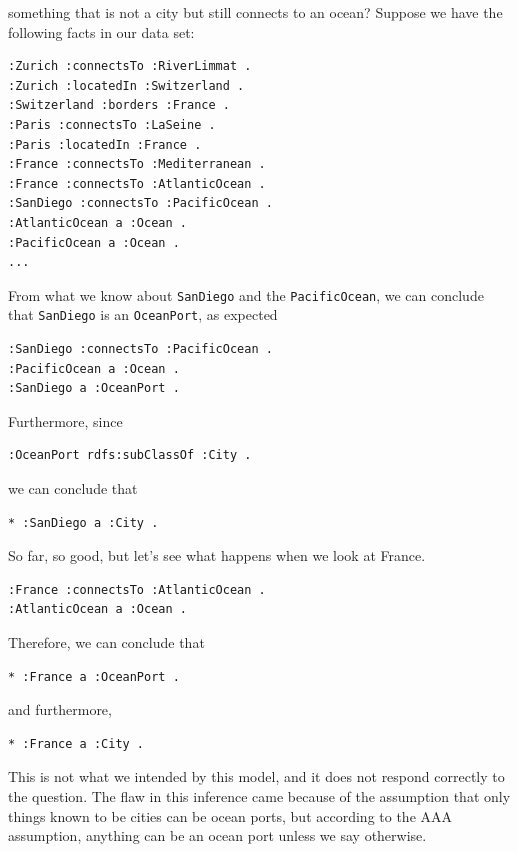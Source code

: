 something that is not a city but still connects to an ocean? Suppose we
have the following facts in our data set:

\begin{lstlisting}
:Zurich :connectsTo :RiverLimmat .
:Zurich :locatedIn :Switzerland .
:Switzerland :borders :France .
:Paris :connectsTo :LaSeine .
:Paris :locatedIn :France .
:France :connectsTo :Mediterranean .
:France :connectsTo :AtlanticOcean .
:SanDiego :connectsTo :PacificOcean .
:AtlanticOcean a :Ocean .
:PacificOcean a :Ocean .
...
\end{lstlisting}

From what we know about \texttt{SanDiego} and the \texttt{PacificOcean}, we can conclude
that
\texttt{SanDiego} is an \texttt{OceanPort}, as expected

\begin{lstlisting}
:SanDiego :connectsTo :PacificOcean .
:PacificOcean a :Ocean .
:SanDiego a :OceanPort .
\end{lstlisting}

Furthermore, since

\begin{lstlisting}
:OceanPort rdfs:subClassOf :City .
\end{lstlisting}

we can conclude that

\begin{lstlisting}
* :SanDiego a :City .
\end{lstlisting}

So far, so good, but let's see what happens when we look at France.

\begin{lstlisting}
:France :connectsTo :AtlanticOcean .
:AtlanticOcean a :Ocean .
\end{lstlisting}

Therefore, we can conclude that

\begin{lstlisting}
* :France a :OceanPort .
\end{lstlisting}

and furthermore,

\begin{lstlisting}
* :France a :City .
\end{lstlisting}

This is not what we intended by this model, and it does not respond
correctly to the question. The flaw in this inference came because of
the assumption that only things known to be cities can be ocean ports,
but according to the AAA assumption, anything can be an ocean port
unless we say otherwise.

